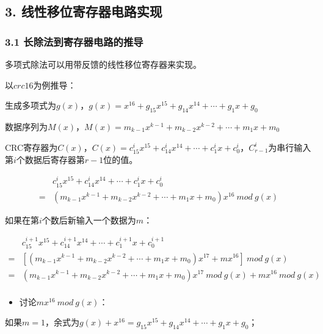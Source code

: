 \documentclass[
]{article}
\begin{document}
\newpage
\hypertarget{header-n131}{%
\subsection{3. 线性移位寄存器电路实现}\label{header-n131}}

\hypertarget{header-n132}{%
\subsubsection{3.1 长除法到寄存器电路的推导}\label{header-n132}}

多项式除法可以用带反馈的线性移位寄存器来实现。

以$crc16$为例推导：

生成多项式为$g(x)$，$g(x)=x^{16}+g_{15}x^{15}+g_{14}x^{14}+\cdots+g_1x+g_0$

数据序列为$M(x)$，$M(x)=m_{k-1}x^{k-1}+m_{k-2}x^{k-2}+\cdots+m_1x+m_0$

CRC寄存器为$C(x)$，$C(x)=c_{15}^ix^{15}+c_{14}^ix^{14}+\cdots+c_1^ix+c_0^i$，$C_{r-1}^i$为串行输入第$i$个数据后寄存器第$r-1$位的值。

\begin{equation}
\begin{aligned}
&c_{15}^ix^{15}+c_{14}^ix^{14}+\cdots+c_1^ix+c_0^i \\
=&(m_{k-1}x^{k-1}+m_{k-2}x^{k-2}+\cdots+m_1x+m_0)x^{16} \: mod \: g(x)
\end{aligned}
\end{equation}

如果在第$i$个数后新输入一个数据为$m$：

\begin{equation}
\begin{aligned}
&c_{15}^{i+1}x^{15}+c_{14}^{i+1}x^{14}+\cdots+c_1^{i+1}x+c_0^{i+1} \\ 
=&[(m_{k-1}x^{k-1}+m_{k-2}x^{k-2}+\cdots+m_1x+m_0)x^{17}+mx^{16}] \: mod \: g(x)\\
=&(m_{k-1}x^{k-1}+m_{k-2}x^{k-2}+\cdots+m_1x+m_0)x^{17} \: mod \: g(x)+mx^{16} \: mod \: g(x)\\
\end{aligned}
\end{equation}

\begin{itemize}
\item
  讨论$mx^{16} \: mod \: g(x)$：
\end{itemize}

如果$m=1$，余式为$g(x)+x^{16}=g_{15}x^{15}+g_{14}x^{14}+\cdots+g_1x+g_0$；
\end{document}
